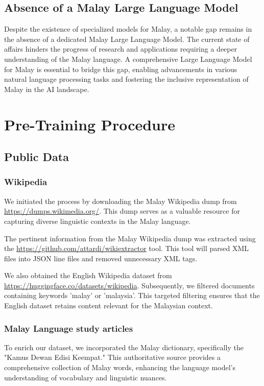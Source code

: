 \documentclass{article}
\begin{document}
\subsection{Absence of a Malay Large Language Model}

Despite the existence of specialized models for Malay, a notable gap remains in the absence of a dedicated Malay Large Language Model. The current state of affairs hinders the progress of research and applications requiring a deeper understanding of the Malay language. A comprehensive Large Language Model for Malay is essential to bridge this gap, enabling advancements in various natural language processing tasks and fostering the inclusive representation of Malay in the AI landscape.

\section{Pre-Training Procedure}

\subsection{Public Data}

\subsubsection{Wikipedia}\label{sec:wikipedia}

We initiated the process by downloading the Malay Wikipedia dump from \url{https://dumps.wikimedia.org/}. This dump serves as a valuable resource for capturing diverse linguistic contexts in the Malay language.

The pertinent information from the Malay Wikipedia dump was extracted using the \url{https://github.com/attardi/wikiextractor} tool. This tool will parsed XML files into JSON line files and removed unnecessary XML tags.

We also obtained the English Wikipedia dataset from \url{https://huggingface.co/datasets/wikipedia}. Subsequently, we filtered documents containing keywords 'malay' or 'malaysia'. This targeted filtering ensures that the English dataset retains content relevant for the Malaysian context.

\subsubsection{Malay Language study articles}

To enrich our dataset, we incorporated the Malay dictionary, specifically the "Kamus Dewan Edisi Keempat." This authoritative source provides a comprehensive collection of Malay words, enhancing the language model's understanding of vocabulary and linguistic nuances.
\end{document}
